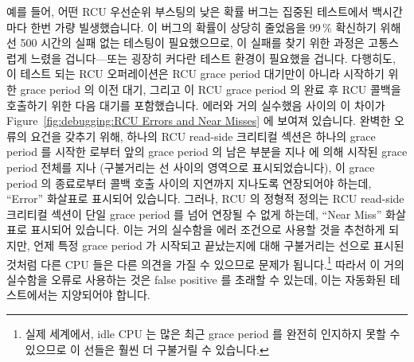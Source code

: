 예를 들어, 어떤 RCU 우선순위 부스팅의 낮은 확률 버그는 집중된 
테스트에서 백시간마다 한번 가량 빌생했습니다.
이 버그의 확률이 상당히 줄었음을 99\,\% 확신하기 위해선 500 시간의 실패 없는
테스팅이 필요했으므로, 이 실패를 찾기 위한  과정은 고통스럽게
느렸을 겁니다---또는 굉장히 커다란 테스트 환경이 필요했을 겁니다.
다행히도, 이 테스트 되는 RCU 오퍼레이션은 RCU grace period 대기만이 아니라
시작하기 위한 grace period 의 이전 대기, 그리고 이 RCU grace period 의 완료 후
RCU 콜백을 호출하기 위한 다음 대기를 포함했습니다.
 에러와 거의 실수했음 사이의 이 차이가
Figure~\ref{fig:debugging:RCU Errors and Near Misses}
에 보여져 있습니다.
완벽한 오류의 요건을 갖추기 위해, 하나의 RCU read-side 크리티컬 섹션은 하나의
grace period 를 시작한  로부터 앞의 grace period 의 남은 부분을
지나  에 의해 시작된 grace period  전체를 지나 (구불거리는 선
사이의 영역으로 표시되었습니다), 이 grace period 의 종료로부터 콜백 호출 사이의
지연까지 지나도록 연장되어야 하는데, ``Error'' 화살표로 표시되어 있습니다.
그러나, RCU 의 정형적 정의는 RCU read-side 크리티컬 섹션이 단일 grace period 를
넘어 연장될 수 없게 하는데, ``Near Miss'' 화살표로 표시되어 있습니다.
이는 거의 실수함을 에러 조건으로 사용할 것을 추천하게 되지만, 언제 특정 grace
period 가 시작되고 끝났는지에 대해 구불거리는 선으로 표시된 것처럼 다른 CPU
들은 다른 의견을 가질 수 있으므로 문제가 됩니다.\footnote{
	실제 세계에서, idle CPU 는 많은 최근 grace period 를 완전히 인지하지
	못할 수 있으므로 이 선들은 훨씬 더 구불거릴 수 있습니다.}
따라서 이 거의 실수함을 오류로 사용하는 것은 false positive 를 초래할 수
있는데, 이는 자동화된  테스트에서는 지양되어야 합니다.

\iffalse

